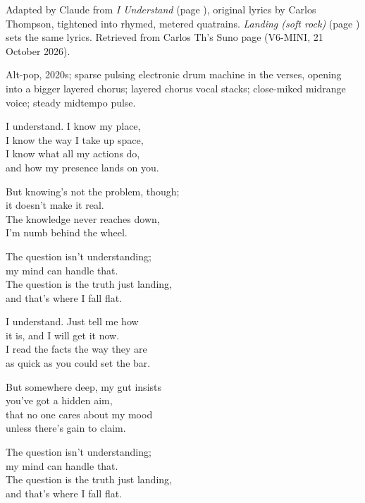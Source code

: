 
\label{sec:landing}
\begin{notes}
Adapted by Claude from \emph{I Understand} (page \pageref{sec:i-understand}), original lyrics by Carlos Thompson, tightened into rhymed, metered quatrains. \emph{Landing (soft rock)} (page \pageref{sec:landing-soft-rock}) sets the same lyrics. Retrieved from Carlos Th's Suno page (V6-MINI, 21 October 2026).
\end{notes}
\begin{style}
Alt-pop, 2020s; sparse pulsing electronic drum machine in the verses, opening into a bigger layered chorus; layered chorus vocal stacks; close-miked midrange voice; steady midtempo pulse.
\end{style}
\begin{lyrics}
I understand. I know my place,\\
I know the way I take up space,\\
I know what all my actions do,\\
and how my presence lands on you.

But knowing's not the problem, though;\\
it doesn't make it real.\\
The knowledge never reaches down,\\
I'm numb behind the wheel.

The question isn't understanding;\\
my mind can handle that.\\
The question is the truth just landing,\\
and that's where I fall flat.

I understand. Just tell me how\\
it is, and I will get it now.\\
I read the facts the way they are\\
as quick as you could set the bar.

But somewhere deep, my gut insists\\
you've got a hidden aim,\\
that no one cares about my mood\\
unless there's gain to claim.

The question isn't understanding;\\
my mind can handle that.\\
The question is the truth just landing,\\
and that's where I fall flat.


\end{lyrics}
